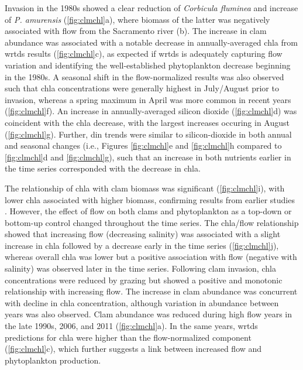 \documentclass[letterpaper,12pt,oneside]{article}\usepackage[]{graphicx}\usepackage[]{color}
\begin{document}
Invasion in the 1980s showed a clear reduction of \textit{Corbicula fluminea} and increase of \textit{P. amurensis} (\cref{fig:clmchl}a), where biomass of the latter was negatively associated with flow from the Sacramento river (b).  The increase in clam abundance was associated with a notable decrease in annually-averaged \ac{chla} from \ac{wrtds} results (\cref{fig:clmchl}c), as expected if \ac{wrtds} is adequately capturing flow variation and identifying the well-established phytoplankton decrease beginning in the 1980s.  A seasonal shift in the flow-normalized results was also observed such that \ac{chla} concentrations were generally highest in July/August prior to invasion, whereas a spring maximum in April was more common in recent years (\cref{fig:clmchl}f).  An increase in annually-averaged silicon dioxide (\cref{fig:clmchl}d) was coincident with the \ac{chla} decrease, with the largest increases occuring in August (\cref{fig:clmchl}g).   Further, \ac{din} trends were similar to silicon-dioxide in both annual and seasonal changes (i.e., Figures \ref{fig:clmchl}e and \ref{fig:clmchl}h compared to \ref{fig:clmchl}d and \ref{fig:clmchl}g), such that an increase in both nutrients earlier in the time series corresponded with the decrease in \ac{chla}.

The relationship of \ac{chla} with clam biomass was significant (\cref{fig:clmchl}i), with lower \ac{chla} associated with higher biomass, confirming results from earlier studies \citep{Alpine92,Thompson08}.  However, the effect of flow on both clams and phytoplankton as a top-down or bottom-up control changed throughout the time series.  The \ac{chla}/flow relationship showed that increasing flow (decreasing salinity) was associated with a slight increase in \ac{chla} followed by a decrease early in the time series (\cref{fig:clmchl}j), whereas overall \ac{chla} was lower but a positive association with flow (negative with salinity) was observed later in the time series. Following clam invasion, \ac{chla} concentrations were reduced by grazing but showed a positive and monotonic relationship with increasing flow. The increase in clam abundance was concurrent with decline in \ac{chla} concentration, although variation in abundance between years was also observed.  Clam abundance was reduced during high flow years in the late 1990s, 2006, and 2011 (\ref{fig:clmchl}a). In the same years, \ac{wrtds} predictions for \ac{chla} were higher than the flow-normalized component (\cref{fig:clmchl}c), which further suggests a link between increased flow and phytoplankton production.
\end{document}
